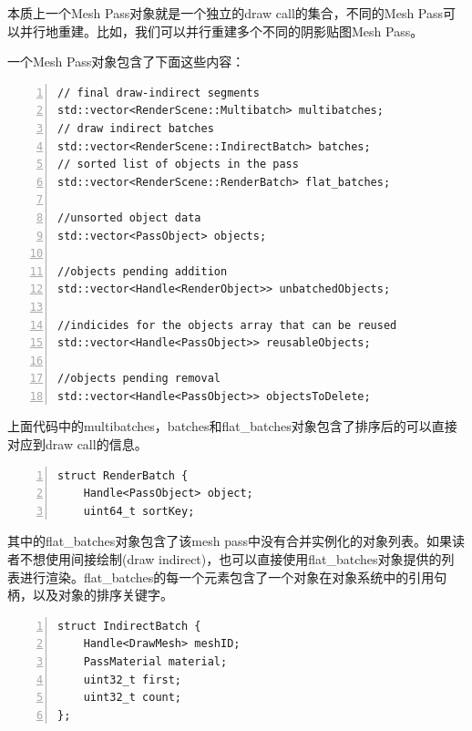 \documentclass{ctexart}
\begin{document}
本质上一个Mesh Pass对象就是一个独立的draw call的集合，不同的Mesh Pass可以并行地重建。比如，我们可以并行重建多个不同的阴影贴图Mesh Pass。

一个Mesh Pass对象包含了下面这些内容：

\begin{lstlisting}[language={[ANSI]C},keywordstyle=\color{blue!70},commentstyle=\color{red!50!green!50!blue!50},frame=shadowbox, rulesepcolor=\color{red!20!green!20!blue!20},basicstyle=\small,numbers=left, numberstyle=\tiny,breaklines=true]
    // final draw-indirect segments
std::vector<RenderScene::Multibatch> multibatches;
// draw indirect batches
std::vector<RenderScene::IndirectBatch> batches;
// sorted list of objects in the pass
std::vector<RenderScene::RenderBatch> flat_batches;

//unsorted object data
std::vector<PassObject> objects;

//objects pending addition
std::vector<Handle<RenderObject>> unbatchedObjects;

//indicides for the objects array that can be reused
std::vector<Handle<PassObject>> reusableObjects;

//objects pending removal
std::vector<Handle<PassObject>> objectsToDelete;
\end{lstlisting}

上面代码中的multibatches，batches和flat\_batches对象包含了排序后的可以直接对应到draw call的信息。

\begin{lstlisting}[language={[ANSI]C},keywordstyle=\color{blue!70},commentstyle=\color{red!50!green!50!blue!50},frame=shadowbox, rulesepcolor=\color{red!20!green!20!blue!20},basicstyle=\small,numbers=left, numberstyle=\tiny,breaklines=true]
struct RenderBatch {
	Handle<PassObject> object;
	uint64_t sortKey;
\end{lstlisting}

其中的flat\_batches对象包含了该mesh pass中没有合并实例化的对象列表。如果读者不想使用间接绘制(draw indirect)，也可以直接使用flat\_batches对象提供的列表进行渲染。flat\_batches的每一个元素包含了一个对象在对象系统中的引用句柄，以及对象的排序关键字。
\begin{lstlisting}[language={[ANSI]C},keywordstyle=\color{blue!70},commentstyle=\color{red!50!green!50!blue!50},frame=shadowbox, rulesepcolor=\color{red!20!green!20!blue!20},basicstyle=\small,numbers=left, numberstyle=\tiny,breaklines=true]
struct IndirectBatch {
	Handle<DrawMesh> meshID;
	PassMaterial material;
	uint32_t first;
	uint32_t count;
};
\end{lstlisting}
\end{document}
